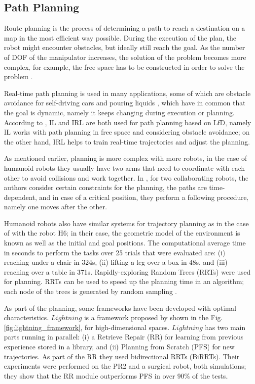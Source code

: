 \documentclass[thesis]{mas_proposal}
\begin{document}
    \subsection{Path Planning}
    
    Route planning is the process of determining a path to reach a destination on a map in the most efficient way possible. During the execution of the plan, the robot might encounter obstacles, but ideally still reach the goal. As the number of DOF of the manipulator increases, the solution of the problem becomes more complex, for example, the free space has to be constructed in order to solve the problem \cite{Siegwart2011}. 
    
    Real-time path planning is used in many applications, some of which are obstacle avoidance for self-driving cars \cite{Chaocheng2015} and pouring liquids \cite{Yamaguchi2015}, which have in common that the goal is dynamic, namely it keeps changing during execution or planning. According to \cite{Xie2020}, IL and IRL are both used for path planning based on LfD, namely IL works with path planning in free space and considering obstacle avoidance; on the other hand, IRL helps to train real-time trajectories and adjust the planning. 
    
    As mentioned earlier, planning is more complex with more robots, in the case of humanoid robots they usually have two arms that need to coordinate with each other to avoid collisions and work together. In \cite{Pecora2018}, for two collaborating robots, the authors consider certain constraints for the planning, the paths are time-dependent, and in case of a critical position, they perform a following procedure, namely one moves after the other.
    
    Humanoid robots also have similar systems for trajectory planning as in the case of \cite{Kuffner2001} with the robot H6; in their case, the geometric model of the environment is known as well as the initial and goal positions. The computational average time in seconds to perform the tasks over 25 trials that were evaluated are: (i) reaching under a chair in 324s, (ii) lifting a leg over a box in 48s, and (iii) reaching over a table in 371s. Rapidly-exploring Random Trees (RRTs) were used for planning. RRTs can be used to speed up the planning time in an algorithm; each node of the trees is generated by random sampling \cite{Veras2019}.
    
    As part of the planning, some frameworks have been developed with optimal characteristics. $Lightning$ is a framework proposed by \cite{Berenson2012} shown in the Fig. \ref{fig:lightning_framework}, for high-dimensional spaces. $Lightning$ has two main parts running in parallel: (i) a Retrieve Repair (RR) for learning from previous experience stored in a library, and (ii) Planning from Scratch (PFS) for new trajectories. As part of the RR they used bidirectional RRTs (BiRRTs). Their experiments were performed on the PR2 and a surgical robot, both simulations; they show that the RR module outperforms PFS in over 90\% of the tests.
    
\end{document}
